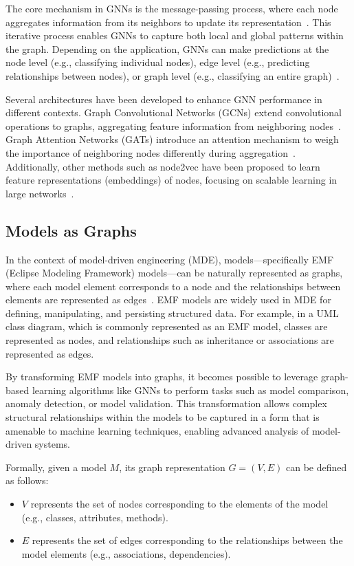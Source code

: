 \documentclass[journal,article,submit,moreauthors,technologies]{Definitions/mdpi}
\begin{document}
The core mechanism in GNNs is the message-passing process, where each node aggregates information from its neighbors to update its representation~\cite{gilmer2017neural}. This iterative process enables GNNs to capture both local and global patterns within the graph. Depending on the application, GNNs can make predictions at the node level (e.g., classifying individual nodes), edge level (e.g., predicting relationships between nodes), or graph level (e.g., classifying an entire graph)~\cite{xu2018powerful}.

Several architectures have been developed to enhance GNN performance in different contexts. Graph Convolutional Networks (GCNs) extend convolutional operations to graphs, aggregating feature information from neighboring nodes~\cite{kipf2016semi}. Graph Attention Networks (GATs) introduce an attention mechanism to weigh the importance of neighboring nodes differently during aggregation~\cite{velivckovic2017graph}. Additionally, other methods such as node2vec have been proposed to learn feature representations (embeddings) of nodes, focusing on scalable learning in large networks~\cite{grover2016node2vec}.

\subsection{Models as Graphs} \label{sec:models_as_graphs}
In the context of model-driven engineering (MDE), models---specifically EMF (Eclipse Modeling Framework) models---can be naturally represented as graphs, where each model element corresponds to a node and the relationships between elements are represented as edges~\cite{brambilla2017model}. EMF models are widely used in MDE for defining, manipulating, and persisting structured data. For example, in a UML class diagram, which is commonly represented as an EMF model, classes are represented as nodes, and relationships such as inheritance or associations are represented as edges.

By transforming EMF models into graphs, it becomes possible to leverage graph-based learning algorithms like GNNs to perform tasks such as model comparison, anomaly detection, or model validation. This transformation allows complex structural relationships within the models to be captured in a form that is amenable to machine learning techniques, enabling advanced analysis of model-driven systems.

Formally, given a model \( M \), its graph representation \( G = (V, E) \) can be defined as follows:
\begin{itemize}
    \item \( V \) represents the set of nodes corresponding to the elements of the model (e.g., classes, attributes, methods).
    \item \( E \) represents the set of edges corresponding to the relationships between the model elements (e.g., associations, dependencies).
\end{itemize}
\end{document}
